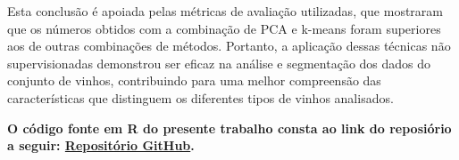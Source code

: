 \documentclass[
  letterpaper,
  DIV=11,
  numbers=noendperiod]{scrartcl}
\begin{document}
Esta conclusão é apoiada pelas métricas de avaliação utilizadas, que
mostraram que os números obtidos com a combinação de PCA e k-means foram
superiores aos de outras combinações de métodos. Portanto, a aplicação
dessas técnicas não supervisionadas demonstrou ser eficaz na análise e
segmentação dos dados do conjunto de vinhos, contribuindo para uma
melhor compreensão das características que distinguem os diferentes
tipos de vinhos analisados.

\textbf{O código fonte em R do presente trabalho consta ao link do
reposiório a seguir:
\href{https://github.com/mello-pedro/UNSUPERV_ML_MCDE_23_24/blob/main/wines_analysis.qmd}{Repositório
GitHub}.}
\end{document}
